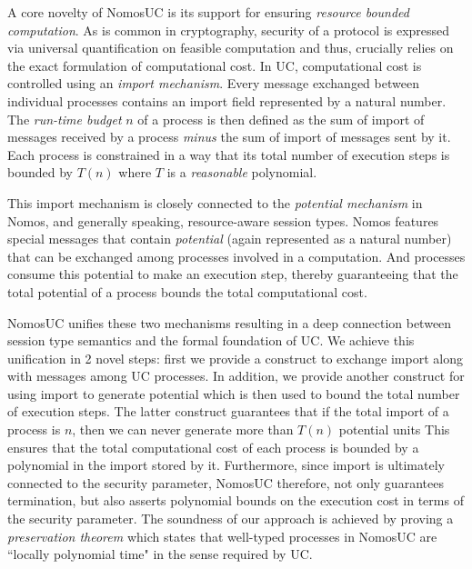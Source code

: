 A core novelty of NomosUC is its support for ensuring \emph{resource bounded computation}.
As is common in cryptography, security of a protocol is expressed via universal quantification
on feasible computation and thus, crucially relies on the exact formulation of computational cost.
In UC, computational cost is controlled using an \emph{import mechanism}.
Every message exchanged between individual processes contains an import field represented by
a natural number.
The \emph{run-time budget} $n$ of a process is then defined as the sum of import of messages
received by a process \emph{minus} the sum of import of messages sent by it.
Each process is constrained in a way that its total number of execution steps is bounded
by $T(n)$ where $T$ is a \emph{reasonable} polynomial.

This import mechanism is closely connected to the \emph{potential mechanism} in Nomos, and
generally speaking, resource-aware session types.
Nomos features special messages that contain \emph{potential} (again represented as a natural
number) that can be exchanged among processes involved in a computation.
And processes consume this potential to make an execution step, thereby guaranteeing that
the total potential of a process bounds the total computational cost.

NomosUC unifies these two mechanisms resulting in a deep connection between session type
semantics and the formal foundation of UC.
We achieve this unification in 2 novel steps: first we provide a construct to exchange import along
with messages among UC processes.
In addition, we provide another construct for using import to generate potential which
is then used to bound the total number of execution steps.
The latter construct guarantees that if the total import of a process is $n$, then we
can never generate more than $T(n)$ potential units
This ensures that the total computational cost of each process is bounded by a polynomial
in the import stored by it.
Furthermore, since import is ultimately connected to the security parameter, NomosUC
therefore, not only guarantees termination, but also asserts polynomial bounds on
the execution cost in terms of the security parameter.
The soundness of our approach is achieved by proving a \emph{preservation theorem}
which states that well-typed processes in NomosUC are ``locally polynomial time"
in the sense required by UC.




